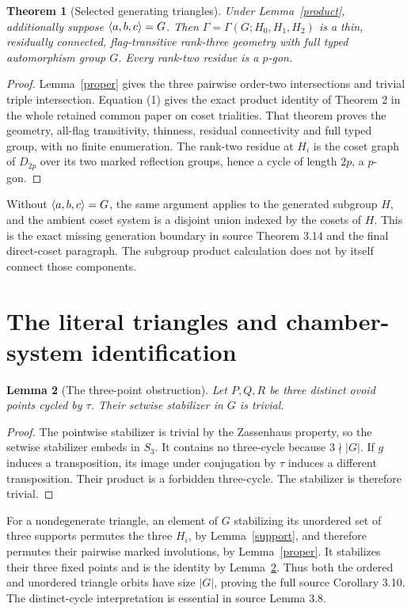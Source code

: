 \documentclass[11pt,a4paper]{article}
\newtheorem{theorem}{Theorem}\newtheorem{lemma}[theorem]{Lemma}
\begin{document}
\begin{theorem}[Selected generating triangles]\label{geometry}
Under Lemma~\ref{product}, additionally suppose $\langle a,b,c\rangle=G$.
Then $\Gamma=\Gamma(G;H_0,H_1,H_2)$ is a thin, residually connected,
flag-transitive rank-three geometry with full typed automorphism group $G$.
Every rank-two residue is a $p$-gon.
\end{theorem}
\begin{proof}
Lemma~\ref{proper} gives the three pairwise order-two intersections and
trivial triple intersection. Equation (1) gives the exact product identity
of Theorem 2 in the whole retained common paper on coset trialities.
That theorem proves the geometry, all-flag transitivity, thinness, residual
connectivity and full typed group, with no finite enumeration.
The rank-two residue at $H_i$ is the coset graph of $D_{2p}$ over its two
marked reflection groups, hence a cycle of length $2p$, a $p$-gon.
\end{proof}
Without $\langle a,b,c\rangle=G$, the same argument applies to the generated subgroup
$H$, and the ambient coset system is a disjoint union indexed by the cosets
of $H$. This is the exact missing generation boundary in source Theorem 3.14
and the final direct-coset paragraph. The subgroup product calculation does
not by itself connect those components.

\section{The literal triangles and chamber-system identification}
\begin{lemma}[The three-point obstruction]\label{three-points}
Let $P,Q,R$ be three distinct ovoid points cycled by $\tau$. Their setwise
stabilizer in $G$ is trivial.
\end{lemma}
\begin{proof}
The pointwise stabilizer is trivial by the Zassenhaus property, so the
setwise stabilizer embeds in $S_3$. It contains no three-cycle because
$3\nmid|G|$. If $g$ induces a transposition, its image under conjugation
by $\tau$ induces a different transposition. Their product is a forbidden
three-cycle. The stabilizer is therefore trivial.
\end{proof}
For a nondegenerate triangle, an element of $G$ stabilizing its unordered
set of three supports permutes the three $H_i$, by Lemma~\ref{support},
and therefore permutes their pairwise marked involutions, by
Lemma~\ref{proper}. It stabilizes their three fixed points and is the
identity by Lemma~\ref{three-points}. Thus both the ordered and unordered
triangle orbits have size $|G|$, proving the full source Corollary 3.10.
The distinct-cycle interpretation is essential in source Lemma 3.8.
\end{document}
